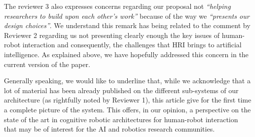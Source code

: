 \documentclass{article}
\begin{document}
The reviewer 3 also expresses concerns regarding our proposal not \emph{``helping
researchers to build upon each other's work''} because of the way we
\emph{``presents our design choices''}. We understand this remark has being
related to the comment by Reviewer 2 regarding us not presenting clearly
enough the key issues of human-robot interaction and consequently, the
challenges that HRI brings to artificial intelligence. As explained above, we
have hopefully addressed this concern in the current version of the paper.

Generally speaking, we would like to underline that, while we acknowledge that a
lot of material has been already published on the different sub-systems of
our architecture (as rightfully noted by Reviewer 1), this article give for the
first time a complete picture of the system. This offers, in our opinion, a
perspective on the state of the art in cognitive robotic architectures
for human-robot interaction that may be of interest for the AI and robotics
research communities.
\end{document}

